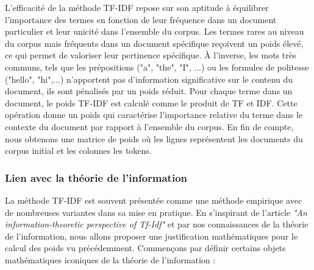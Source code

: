 \documentclass[12pt]{article}
\theoremstyle{definition}
\begin{document}
	L'efficacité de la méthode TF-IDF repose sur son aptitude à équilibrer l'importance des termes en fonction de leur fréquence dans un document particulier et leur unicité dans l'ensemble du corpus. Les termes rares au niveau du corpus mais fréquents dans un document spécifique reçoivent un poids élevé, ce qui permet de valoriser leur pertinence spécifique. À l'inverse, les mots très communs, tels que les prépositions ("a", "the", "I", ...) ou les formules de politesse ("hello", "hi",...)  n'apportent pas d'information significative sur le contenu du document, ils sont pénalisés par un poids réduit. Pour chaque terme dans un document, le poids TF-IDF est calculé comme le produit de TF et IDF. Cette opération donne un poids qui caractérise l'importance relative du terme dans le contexte du document par rapport à l'ensemble du corpus. En fin de compte, nous obtenons une matrice de poids où les lignes représentent les documents du corpus initial et les colonnes les tokens. 
	
	\subsubsection{Lien avec la théorie de l'information}
	
	La méthode TF-IDF est souvent présentée comme une méthode empirique avec de nombreuses variantes dans sa mise en pratique. En s'inspirant de l'article \textit{"An information-theoretic perspective of Tf-Idf"} \cite{TF_IDF_measures} et par nos connaissances de la théorie de l'information, nous allons proposer une justification mathématiques pour le calcul des poids vu précédemment. Commençons par définir certains objets mathématiques iconiques de la théorie de l'information :
	
\end{document}
